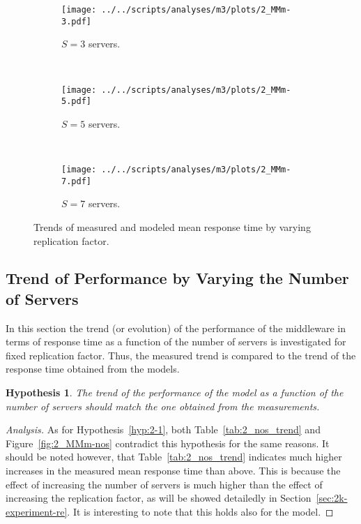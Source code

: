 \documentclass[11pt]{article}
\newtheorem{hyp}{Hypothesis}
\theoremstyle{definition}
\newenvironment{ana}[1][\proofname]{\begin{proof}[Analysis]}{\end{proof}}
\begin{document}
\begin{figure}[!h]
    \newcommand\wdt{10cm}
    \centering
    \begin{subfigure}[t]{\wdt}
        \centering
        \texttt{[image: ../../scripts/analyses/m3/plots/2\_MMm-3.pdf]}
        \caption{$S=3$ servers.}\label{fig:2_MMm-3}
    \end{subfigure}
    \\\vspace{3mm}
    \begin{subfigure}[t]{\wdt}
        \centering
        \texttt{[image: ../../scripts/analyses/m3/plots/2\_MMm-5.pdf]}
        \caption{$S=5$ servers.}\label{fig:2_MMm-5}
    \end{subfigure}
    \\\vspace{3mm}
    \begin{subfigure}[t]{\wdt}
        \centering
        \texttt{[image: ../../scripts/analyses/m3/plots/2\_MMm-7.pdf]}
        \caption{$S=7$ servers.}\label{fig:2_MMm-7}
    \end{subfigure}
    \caption{Trends of measured and modeled mean response time by varying replication factor.}
    \label{fig:2_MMm-repl}
\end{figure}

\subsection{Trend of Performance by Varying the Number of Servers}

In this section the trend (or evolution) of the performance of the middleware in terms of response time as a function of the number of servers is investigated for fixed replication factor.
Thus, the measured trend is compared to the trend of the response time obtained from the models.

\begin{hyp}
    The trend of the performance of the model as a function of the number of servers should match the one obtained from the measurements.
\end{hyp}
\begin{ana}
    As for Hypothesis~\ref{hyp:2-1}, both Table~\ref{tab:2_nos_trend} and Figure~\ref{fig:2_MMm-nos} contradict this hypothesis for the same reasons.
    It should be noted however, that Table~\ref{tab:2_nos_trend} indicates much higher increases in the measured mean response time than above.
    This is because the effect of increasing the number of servers is much higher than the effect of increasing the replication factor, as will be showed detailedly in Section~\ref{sec:2k-experiment-re}.
    It is interesting to note that this holds also for the model.
\end{ana}
\end{document}
